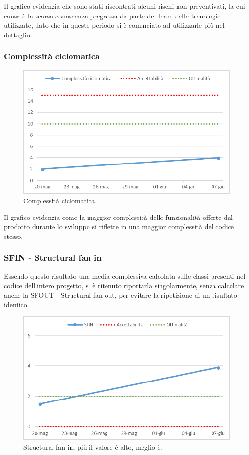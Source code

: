 Il grafico evidenzia che sono stati riscontrati alcuni rischi non preventivati, la cui causa è la scarsa conoscenza pregressa da parte del team delle tecnologie utilizzate, dato che in questo periodo si è cominciato ad utilizzarle più nel dettaglio.

\subsubsection{Complessità ciclomatica}

\begin{figure}[h!]
	\centering
	\includegraphics[scale=0.75]{img/Grafici/ciclomatica.png}
	\caption{Complessità ciclomatica.}
	\label{fig:Ciclomatica}
\end{figure}

Il grafico evidenzia come la maggior complessità delle funzionalità offerte dal prodotto durante lo sviluppo si riflette in una maggior complessità del codice stesso.

\subsubsection{SFIN - Structural fan in}

Essendo questo risultato una media complessiva calcolata sulle classi presenti nel codice dell'intero progetto, si è ritenuto riportarla singolarmente, senza calcolare anche la SFOUT - Structural fan out, per evitare la ripetizione di un risultato identico.

\begin{figure}[h!]
	\centering
	\includegraphics[scale=0.75]{img/Grafici/SFIN.png}
	\caption{Structural fan in, più il valore è alto, meglio è.}
	\label{fig:SFIN}
\end{figure}

